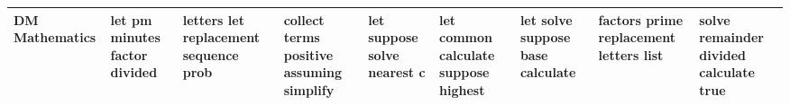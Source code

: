 \documentclass[11pt,a4paper]{article}
\begin{document}
\begin{appendices}
\begin{table}[htp]
\begin{tiny}
\begin{tabular}{|p{}|p{}|p{}|p{}|p{}|p{}|p{}|p{}|p{}|}
DM Mathematics & let \newline pm \newline minutes \newline factor \newline divided & letters \newline let \newline replacement \newline sequence \newline prob & collect \newline terms \newline positive \newline assuming \newline simplify & let \newline suppose \newline solve \newline nearest \newline c & let \newline common \newline calculate \newline suppose \newline highest & let \newline solve \newline suppose \newline base \newline calculate & factors \newline prime \newline replacement \newline letters \newline list & solve \newline remainder \newline divided \newline calculate \newline true\\\hline

\end{tabular}
\end{tiny}
\end{table}
\end{appendices}
\end{document}
